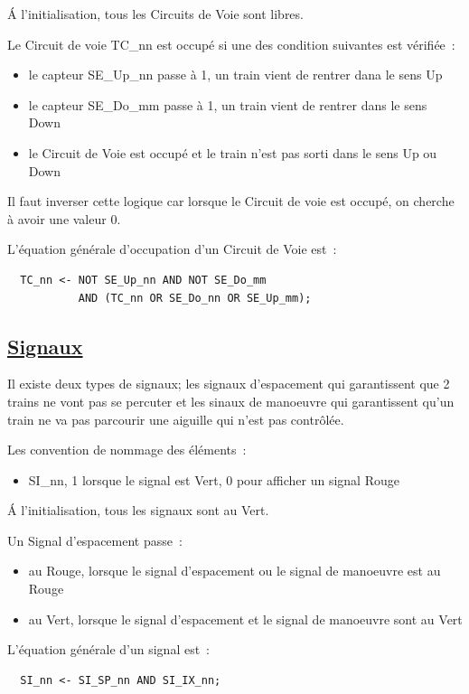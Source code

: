 \'A l'initialisation, tous les Circuits de Voie sont libres. 

\medskip
Le Circuit de voie TC\_nn est occupé si une des condition suivantes est vérifiée~:
\begin{itemize}
\item le capteur SE\_Up\_nn passe à 1, un train vient de rentrer dana le sens Up
\item le capteur SE\_Do\_mm passe à 1, un train vient de rentrer dans le sens Down
\item le Circuit de Voie est occupé et le train n'est pas sorti dans le sens Up ou Down
\end{itemize}

Il faut inverser cette logique car lorsque le Circuit de voie est occupé, on cherche à
avoir une valeur 0.

\medskip
L'équation générale d'occupation d'un Circuit de Voie est~:
\begin{lstlisting}
  TC_nn <- NOT SE_Up_nn AND NOT SE_Do_mm 
           AND (TC_nn OR SE_Do_nn OR SE_Up_mm);
\end{lstlisting}


\subsection{\underline{Signaux}}
\label{sec:esp}

Il existe deux types de signaux; les signaux d'espacement qui garantissent
que 2 trains ne vont pas se percuter et les sinaux de manoeuvre qui garantissent
qu'un train ne va pas parcourir une aiguille qui n'est pas contrôlée.

Les convention de nommage des éléments~:
\begin{itemize}
\item SI\_nn, 1 lorsque le signal est Vert, 0 pour afficher un signal Rouge
\end{itemize}

\'A l'initialisation, tous les signaux sont au Vert. 

Un Signal d'espacement passe~:
\begin{itemize}
\item au Rouge, lorsque le signal d'espacement ou le signal de manoeuvre est au Rouge
\item au Vert, lorsque le signal d'espacement et le signal de manoeuvre sont au Vert
\end{itemize}


\medskip
L'équation générale d'un signal est~:
\begin{lstlisting}
  SI_nn <- SI_SP_nn AND SI_IX_nn;
\end{lstlisting}


